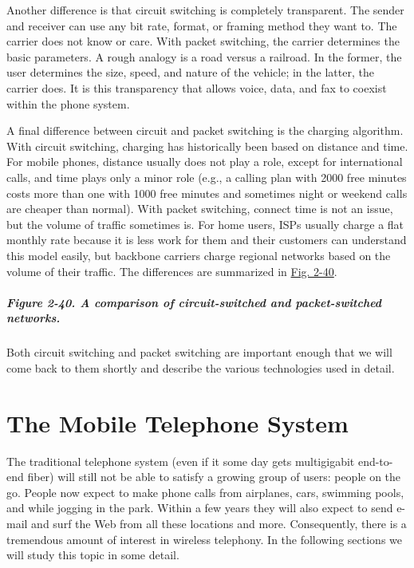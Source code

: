 \documentclass[b5paper,11pt]{memoir}
\begin{document}
Another difference is that circuit switching is completely transparent.
The sender and receiver can use any bit rate, format, or framing method
they want to. The carrier does not know or care. With packet switching,
the carrier determines the basic parameters. A rough analogy is a road
versus a railroad. In the former, the user determines the size, speed,
and nature of the vehicle; in the latter, the carrier does. It is this
transparency that allows voice, data, and fax to coexist within the
phone system.

A final difference between circuit and packet switching is the charging
algorithm. With circuit switching, charging has historically been based
on distance and time. For mobile phones, distance usually does not play
a role, except for international calls, and time plays only a minor role
(e.g., a calling plan with 2000 free minutes costs more than one with
1000 free minutes and sometimes night or weekend calls are cheaper than
normal). With packet switching, connect time is not an issue, but the
volume of traffic sometimes is. For home users, ISPs usually charge a
flat monthly rate because it is less work for them and their customers
can understand this model easily, but backbone carriers charge regional
networks based on the volume of their traffic. The differences are
summarized in
\protect\hyperlink{0130661023_ch02lev1sec5.htmlux5cux23ch02fig40}{Fig.
2-40}.

\subparagraph[Figure 2-40. A comparison of circuit-switched and
packet-switched
networks.]{\texorpdfstring{\protect\hypertarget{0130661023_ch02lev1sec5.htmlux5cux23ch02fig40}{}{}Figure
2-40. A comparison of circuit-switched and packet-switched
networks.}{Figure 2-40. A comparison of circuit-switched and packet-switched networks.}}


Both circuit switching and packet switching are important enough that we
will come back to them shortly and describe the various technologies
used in detail.



\section{The Mobile Telephone System}

The traditional telephone system (even if it some day gets multigigabit
end-to-end fiber) will still not be able to satisfy a growing group of
users: people on the go. People now expect to make phone calls from
airplanes, cars, swimming pools, and while jogging in the park. Within a
few years they will also expect to send e-mail and surf the Web from all
these locations and more. Consequently, there is a tremendous amount of
interest in wireless telephony. In the following sections we will study
this topic in some detail.
\end{document}
